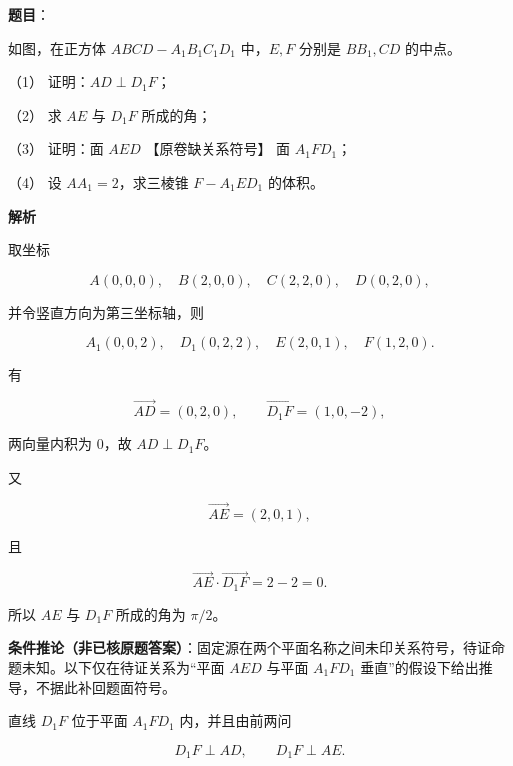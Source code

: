 \begin{answer}

\textbf{题目}：

如图，在正方体 $ABCD-A_1B_1C_1D_1$ 中，$E,F$ 分别是 $BB_1,CD$ 的中点。

（1） 证明：$AD\perp D_1F$；

（2） 求 $AE$ 与 $D_1F$ 所成的角；

（3） 证明：面 $AED$ 【原卷缺关系符号】 面 $A_1FD_1$；

（4） 设 $AA_1=2$，求三棱锥 $F-A_1ED_1$ 的体积。
\nopagebreak[4]
\begin{center}\end{center}
\nopagebreak[4]
\textbf{解析}

取坐标

\nopagebreak[4]
\[
A(0,0,0),\quad B(2,0,0),\quad C(2,2,0),\quad D(0,2,0),
\]

并令竖直方向为第三坐标轴，则

\nopagebreak[4]
\[
A_1(0,0,2),\quad D_1(0,2,2),\quad E(2,0,1),\quad F(1,2,0).
\]


有

\nopagebreak[4]
\[
\overrightarrow{AD}=(0,2,0),
\qquad
\overrightarrow{D_1F}=(1,0,-2),
\]

两向量内积为 $0$，故 $AD\perp D_1F$。


又

\nopagebreak[4]
\[
\overrightarrow{AE}=(2,0,1),
\]

且

\nopagebreak[4]
\[
\overrightarrow{AE}\cdot\overrightarrow{D_1F}=2-2=0.
\]

所以 $AE$ 与 $D_1F$ 所成的角为 $\pi/2$。


\begin{gktip}
\textbf{条件推论（非已核原题答案）}：固定源在两个平面名称之间未印关系符号，待证命题未知。以下仅在待证关系为“平面 $AED$ 与平面 $A_1FD_1$ 垂直”的假设下给出推导，不据此补回题面符号。
\end{gktip}

直线 $D_1F$ 位于平面 $A_1FD_1$ 内，并且由前两问

\nopagebreak[4]
\[
D_1F\perp AD,\qquad D_1F\perp AE.
\]


\end{answer}
